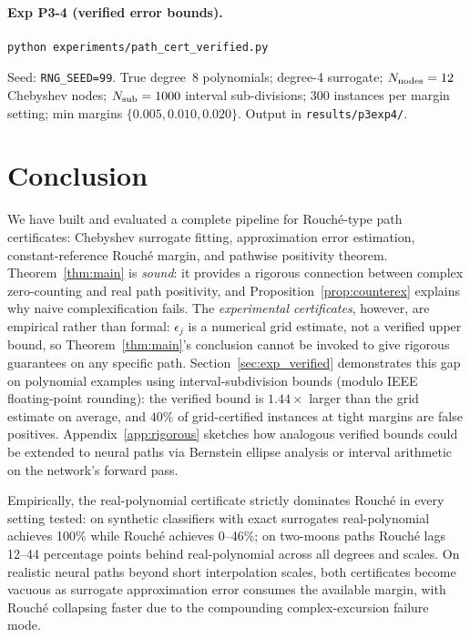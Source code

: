 \documentclass{article}
\theoremstyle{definition}
\begin{document}
\paragraph{Exp P3-4 (verified error bounds).}
\begin{verbatim}
python experiments/path_cert_verified.py
\end{verbatim}
Seed: \texttt{RNG\_SEED=99}.
True degree~8 polynomials; degree-4 surrogate; $N_{\rm nodes}=12$ Chebyshev
nodes; $N_{\rm sub}=1000$ interval sub-divisions; 300 instances per margin
setting; min margins $\{0.005, 0.010, 0.020\}$.
Output in \texttt{results/p3exp4/}.

\section{Conclusion}
\label{sec:conclusion}

We have built and evaluated a complete pipeline for Rouch\'e-type path
certificates: Chebyshev surrogate fitting, approximation error estimation,
constant-reference Rouch\'e margin, and pathwise positivity theorem.
Theorem~\ref{thm:main} is \emph{sound}: it provides a rigorous connection
between complex zero-counting and real path positivity, and
Proposition~\ref{prop:counterex} explains why naive complexification fails.
The \emph{experimental certificates}, however, are empirical rather than
formal: $\epsilon_j$ is a numerical grid estimate, not a verified upper bound,
so Theorem~\ref{thm:main}'s conclusion cannot be invoked to give rigorous
guarantees on any specific path.
Section~\ref{sec:exp_verified} demonstrates this gap on polynomial examples
using interval-subdivision bounds (modulo IEEE floating-point rounding): the
verified bound is $1.44\times$ larger than the grid estimate on average, and
$40\%$ of grid-certified instances at tight margins are false positives.
Appendix~\ref{app:rigorous} sketches how analogous verified bounds could be
extended to neural paths via Bernstein ellipse analysis or interval arithmetic
on the network's forward pass.

Empirically, the real-polynomial certificate strictly dominates Rouché
in every setting tested: on synthetic classifiers with exact surrogates
real-polynomial achieves 100\% while Rouché achieves 0--46\%; on
two-moons paths Rouché lags 12--44 percentage points behind real-polynomial
across all degrees and scales.  On realistic neural paths beyond short
interpolation scales, both certificates become vacuous as surrogate
approximation error consumes the available margin, with Rouché collapsing
faster due to the compounding complex-excursion failure mode.
\end{document}
